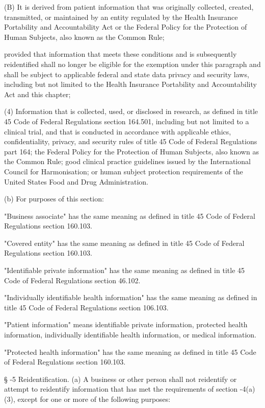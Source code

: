           (B)  It is derived from patient information that was originally collected, created, transmitted, or maintained by an entity regulated by the Health Insurance Portability and Accountability Act or the Federal Policy for the Protection of Human Subjects, also known as the Common Rule;

          provided that information that meets these conditions and is subsequently reidentified shall no longer be eligible for the exemption under this paragraph and shall be subject to applicable federal and state data privacy and security laws, including but not limited to the Health Insurance Portability and Accountability Act and this chapter;

     (4)  Information that is collected, used, or disclosed in research, as defined in title 45 Code of Federal Regulations section 164.501, including but not limited to a clinical trial, and that is conducted in accordance with applicable ethics, confidentiality, privacy, and security rules of title 45 Code of Federal Regulations part 164; the Federal Policy for the Protection of Human Subjects, also known as the Common Rule; good clinical practice guidelines issued by the International Council for Harmonisation; or human subject protection requirements of the United States Food and Drug Administration.

     (b)  For purposes of this section:

     "Business associate" has the same meaning as defined in title 45 Code of Federal Regulations section 160.103.

     "Covered entity" has the same meaning as defined in title 45 Code of Federal Regulations section 160.103.

     "Identifiable private information" has the same meaning as defined in title 45 Code of Federal Regulations section 46.102.

     "Individually identifiable health information" has the same meaning as defined in title 45 Code of Federal Regulations section 106.103.

     "Patient information" means identifiable private information, protected health information, individually identifiable health information, or medical information.

     "Protected health information" has the same meaning as defined in title 45 Code of Federal Regulations section 160.103.

     §   -5  Reidentification.  (a)  A business or other person shall not reidentify or attempt to reidentify information that has met the requirements of section    -4(a)(3), except for one or more of the following purposes:

